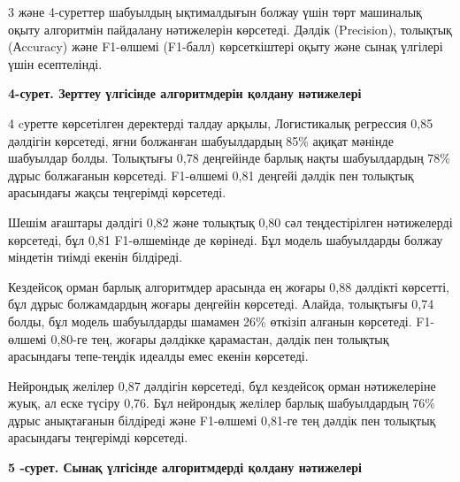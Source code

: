 3 және 4-суреттер шабуылдың ықтималдығын болжау үшін төрт машиналық
оқыту алгоритмін пайдалану нәтижелерін көрсетеді. Дәлдік (Precision),
толықтық (Аccuracy) және F1-өлшемі (F1-балл) көрсеткіштері оқыту және
сынақ үлгілері үшін есептелінді.

{\bfseries 4-сурет. Зерттеу үлгісінде алгоритмдерін қолдану нәтижелері}

4 cуретте көрсетілген деректерді талдау арқылы, Логистикалық регрессия
0,85 дәлдігін көрсетеді, яғни болжанған шабуылдардың 85\% ақиқат мәнінде
шабуылдар болды. Толықтығы 0,78 деңгейінде барлық нақты шабуылдардың
78\% дұрыс болжағанын көрсетеді. F1-өлшемі 0,81 деңгейі дәлдік пен
толықтық арасындағы жақсы теңгерімді көрсетеді.

Шешім ағаштары дәлдігі 0,82 және толықтық 0,80 сәл теңдестірілген
нәтижелерді көрсетеді, бұл 0,81 F1-өлшемінде де көрінеді. Бұл модель
шабуылдарды болжау міндетін тиімді екенін білдіреді.

Кездейсоқ орман барлық алгоритмдер арасында ең жоғары 0,88 дәлдікті
көрсетті, бұл дұрыс болжамдардың жоғары деңгейін көрсетеді. Алайда,
толықтығы 0,74 болды, бұл модель шабуылдарды шамамен 26\% өткізіп
алғанын көрсетеді. F1-өлшемі 0,80-ге тең, жоғары дәлдікке қарамастан,
дәлдік пен толықтық арасындағы тепе-теңдік идеалды емес екенін
көрсетеді.

Нейрондық желілер 0,87 дәлдігін көрсетеді, бұл кездейсоқ орман
нәтижелеріне жуық, ал еске түсіру 0,76. Бұл нейрондық желілер барлық
шабуылдардың 76\% дұрыс анықтағанын білдіреді және F1-өлшемі 0,81-ге тең
дәлдік пен толықтық арасындағы теңгерімді көрсетеді.

{\bfseries 5 -сурет. Сынақ үлгісінде алгоритмдерді қолдану нәтижелері}


